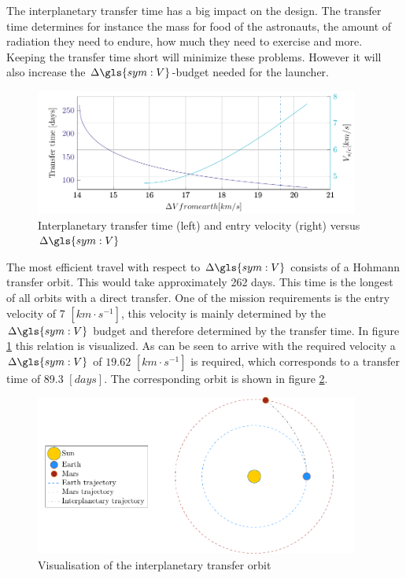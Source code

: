 The interplanetary transfer time has a big impact on the design. The transfer time determines for instance the mass for food of the astronauts, the amount of radiation they need to endure, how much they need to exercise and more. Keeping the transfer time short will minimize these problems. However it will also increase the $\Delta\gls{sym:V}$-budget needed for the launcher. 

\begin{figure}[h]
	\centering
	\includegraphics[width=0.95\textwidth]{Figure/Inter_transfer/transfer_time.pdf}
	\caption[Interplanetary transfer time and entry velocity versus $\Delta\gls{sym:V}$]{Interplanetary transfer time (left) and entry velocity (right) versus $\Delta\gls{sym:V}$}
	\label{fig:inter_time}
\end{figure}

The most efficient travel with respect to $\Delta\gls{sym:V}$ consists of a Hohmann transfer orbit. This would take approximately 262 days. This time is the longest of all orbits with a direct transfer. One of the mission requirements is the entry velocity of 7 $\left[km \cdot s^{-1}\right]$, this velocity is mainly determined by the $\Delta \gls{sym:V}$ budget and therefore determined by the transfer time. In figure \ref{fig:inter_time} this relation is visualized. As can be seen to arrive with the required velocity a $\Delta \gls{sym:V}$ of $19.62$ $\left[km \cdot s^{-1}\right]$ is required, which corresponds to a transfer time of 89.3 $\left[days\right]$. The corresponding orbit is shown in figure \ref{fig:inter_orbit}.

\begin{figure}[h]
	\centering
	\includegraphics[width=0.95\textwidth]{Figure/Inter_transfer/orbits.pdf}
	\caption{Visualisation of the interplanetary transfer orbit}
	\label{fig:inter_orbit}
\end{figure}
